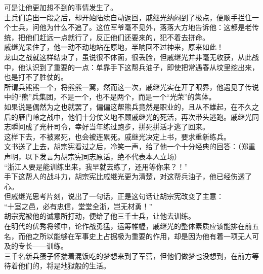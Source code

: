 \begin{multicols}{\theparacolNo}
可是让他更加想不到的事情发生了。\\

士兵们追出一段之后，却开始陆续自动返回，戚继光纳闷到了极点，便顺手拦住一个士兵，问他为什么不追了。这位军爷毫不见外，落落大方地告诉他：这都是老传统，把他们赶远一点就行了，反正他们还要来的，犯不着去拼命。\\

戚继光呆住了，他一动不动地站在原地，半晌回不过神来，原来如此！\\

龙山之战就这样结束了，虽说很不体面，很丢脸，但戚继光并非毫无收获，从此战中，他认识到了重要的一点：单靠手下这帮兵油子，即使把常遇春从坟里挖出来，也是打不了胜仗的。\\

所谓兵熊熊一个，将熊熊一窝，然而这一次，戚继光实在开了眼界，他遇见了传说中的“熊”兵集团，不是一个，也不是两个，而是一个“光荣”的集体。\\

如果说是偶然为之也就罢了，偏偏这帮熊兵竟然是职业的，且从不雄起，在不久之后的雁门岭之战中，他们十分仗义地不顾戚继光的死活，再次带头逃跑。戚继光同志瞬间成了光杆司令，幸好当年练过跑步，拼死拼活才逃了回来。\\

这样下去，不被累死，也会被连累死。戚继光决定上书，要求重新练兵。\\

文书送了上去，胡宗宪看过之后，冷笑一声，给了他一个十分经典的回答：（郑重声明，以下发言为胡宗宪同志原话，绝不代表本人立场）\\

“浙江人要是能训练出来，我早就去练了，还用等你来？！”\\

手下这帮人的战斗力，胡宗宪比戚继光更为清楚，对这帮兵油子，他已经伤透了心。\\

但戚继光思考片刻，说出了一句话，正是这句话让胡宗宪改变了主意：\\

“十室之邑，必有忠信，堂堂全浙，岂无材勇！”\\

胡宗宪被他的诚意所打动，便给了他三千士兵，让他去训练。\\

在明代的优秀将领中，论作战勇猛，运筹帷幄，戚继光的整体素质应该能排在前五名，而他之所以能够在军事史上占据极为重要的作用，却是因为他有着一项无人可及的专长——训练。\\

三千名新兵蛋子怀揣着混饭吃的梦想来到了军营，但他们做梦也没想到，在前方等待着他们的，将是地狱般的生活。\\


\end{multicols}
